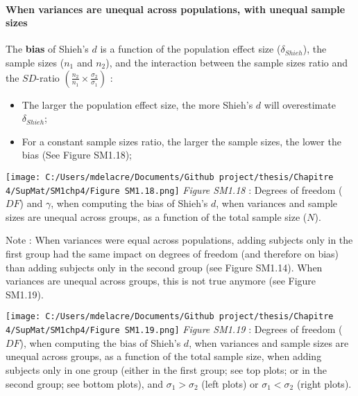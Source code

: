 \documentclass[
  english,
  man,mask,floatsintext]{apa6}
\providecommand{\tightlist}{%
  \setlength{\itemsep}{0pt}\setlength{\parskip}{0pt}}
\let\oldparagraph\paragraph
\renewcommand{\paragraph}[1]{\oldparagraph{#1}\mbox{}}
\begin{document}
\hypertarget{when-variances-are-unequal-across-populations-with-unequal-sample-sizes-1}{%
\paragraph{When variances are unequal across populations, with unequal sample sizes}\label{when-variances-are-unequal-across-populations-with-unequal-sample-sizes-1}}

The \textbf{bias} of Shieh's \(d\) is a function of the population effect size (\(\delta_{Shieh}\)), the sample sizes (\(n_1\) and \(n_2\)), and the interaction between the sample sizes ratio and the \(SD\)-ratio \(\left(\frac{n_2}{n_1}\times\frac{\sigma_2}{\sigma_1} \right)\) :

\begin{itemize}
\tightlist
\item
  The larger the population effect size, the more Shieh's \(d\) will overestimate \(\delta_{Shieh}\);
\end{itemize}

\newpage

\begin{itemize}
\tightlist
\item
  For a constant sample sizes ratio, the larger the sample sizes, the lower the bias (See Figure SM1.18);
\end{itemize}

\texttt{[image: C:/Users/mdelacre/Documents/Github project/thesis/Chapitre 4/SupMat/SM1chp4/Figure SM1.18.png]}
\emph{Figure SM1.18} : Degrees of freedom (\(DF\)) and \(\gamma\), when computing the bias of Shieh's \(d\), when variances and sample sizes are unequal across groups, as a function of the total sample size (\(N\)).

\newpage

Note : When variances were equal across populations, adding subjects only in the first group had the same impact on degrees of freedom (and therefore on bias) than adding subjects only in the second group (see Figure SM1.14). When variances are unequal across groups, this is not true anymore (see Figure SM1.19).

\texttt{[image: C:/Users/mdelacre/Documents/Github project/thesis/Chapitre 4/SupMat/SM1chp4/Figure SM1.19.png]}
\emph{Figure SM1.19} : Degrees of freedom (\(DF\)), when computing the bias of Shieh's \(d\), when variances and sample sizes are unequal across groups, as a function of the total sample size, when adding subjects only in one group (either in the first group; see top plots; or in the second group; see bottom plots), and \(\sigma_1 > \sigma_2\) (left plots) or \(\sigma_1 < \sigma_2\) (right plots).
\end{document}

